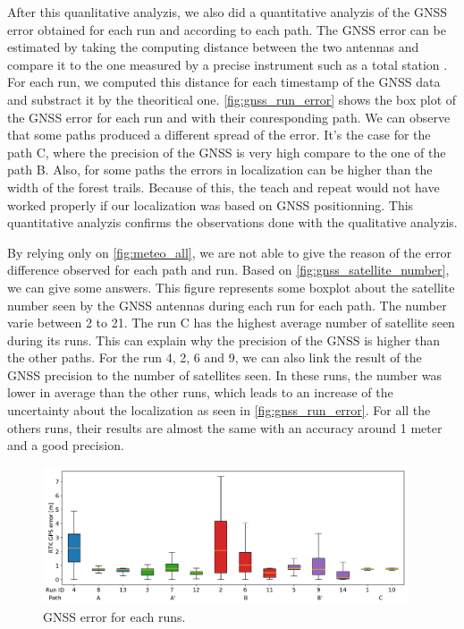 After this quanlitative analyzis, we also did a quantitative analyzis of the \ac{GNSS} error obtained for each run and according to each path.
The \ac{GNSS} error can be estimated by taking the computing distance between the two antennas and compare it to the one measured by a precise instrument such as a total station \citep{Vaidis2021}.
For each run, we computed this distance for each timestamp of the \ac{GNSS} data and substract it by the theoritical one.
\autoref{fig:gnss_run_error} shows the box plot of the \ac{GNSS} error for each run and with their conresponding path.
We can observe that some paths produced a different spread of the error.
It's the case for the path C, where the precision of the \ac{GNSS} is very high compare to the one of the path B.
Also, for some paths the errors in localization can be higher than the width of the forest trails.
Because of this, the teach and repeat would not have worked properly if our localization was based on \ac{GNSS} positionning.
This quantitative analyzis confirms the observations done with the qualitative analyzis.

By relying only on \autoref{fig:meteo_all}, we are not able to give the reason of the error difference observed for each path and run.
Based on \autoref{fig:gnss_satellite_number}, we can give some answers.
This figure represents some boxplot about the satellite number seen by the \ac{GNSS} antennas during each run for each path.
The number varie between 2 to 21.
The run C has the highest average number of satellite seen during its runs.
This can explain why the precision of the \ac{GNSS} is higher than the other paths.
For the run 4, 2, 6 and 9, we can also link the result of the \ac{GNSS} precision to the number of satellites seen.
In these runs, the number was lower in average than the other runs, which leads to an increase of the uncertainty about the localization as seen in \autoref{fig:gnss_run_error}.
For all the others runs, their results are almost the same with an accuracy around 1 meter and a good precision.

\begin{figure} [htpb]
	\centering
	\includegraphics[height=1.6in]{./figs/GPS/RTK_error.pdf}
	\caption{GNSS error for each runs.}
	\label{fig:gnss_run_error}
\end{figure}

